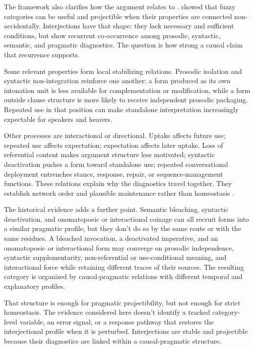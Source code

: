 \documentclass[12pt]{article}
\begin{document}
The framework also clarifies how the argument relates to
. \textcite{boyd1999} showed
that fuzzy categories can be useful and projectible when their
properties are connected non-accidentally. Interjections have that shape:
they lack necessary and sufficient conditions, but show recurrent
co-occurrence among prosodic, syntactic, semantic, and pragmatic
diagnostics. The question is how strong a causal claim that recurrence
supports.

Some relevant properties form local stabilizing relations. Prosodic
isolation and syntactic non-integration reinforce one another: a form
produced as its own intonation unit is less available for complementation
or modification, while a form outside clause structure is more likely to
receive independent prosodic packaging. Repeated use in that position can
make standalone interpretation increasingly expectable for speakers and
hearers.

Other processes are interactional or directional. Uptake affects future
use; repeated use affects expectation; expectation affects later uptake.
Loss of referential content makes argument structure less motivated;
syntactic deactivation pushes a form toward standalone use; repeated
conversational deployment entrenches stance, response, repair, or
sequence-management functions. These relations explain why the
diagnostics travel together. They establish network order and plausible
maintenance rather than homeostasis
\citep[cf.][]{weinberger2026HomeostasisCausalControl}.

The historical evidence adds a further point. Semantic bleaching,
syntactic deactivation, and onomatopoeic or interactional coinage can all
recruit forms into a similar pragmatic profile, but they don't do so by
the same route or with the same residues. A bleached invocation, a
deactivated imperative, and an onomatopoeic or interactional form may
converge on prosodic independence, syntactic supplementarity,
non-referential or use-conditional meaning, and interactional force while
retaining different traces of their sources. The resulting category is
organized by causal-pragmatic relations with different temporal and
explanatory profiles.

That structure is enough for pragmatic projectibility, but not enough
for strict homeostasis. The evidence considered here doesn't identify a
tracked category-level variable, an error signal, or a response pathway
that restores the interjectional profile when it is perturbed.
Interjections are stable and projectible because their diagnostics are
linked within a causal-pragmatic structure.
\end{document}
